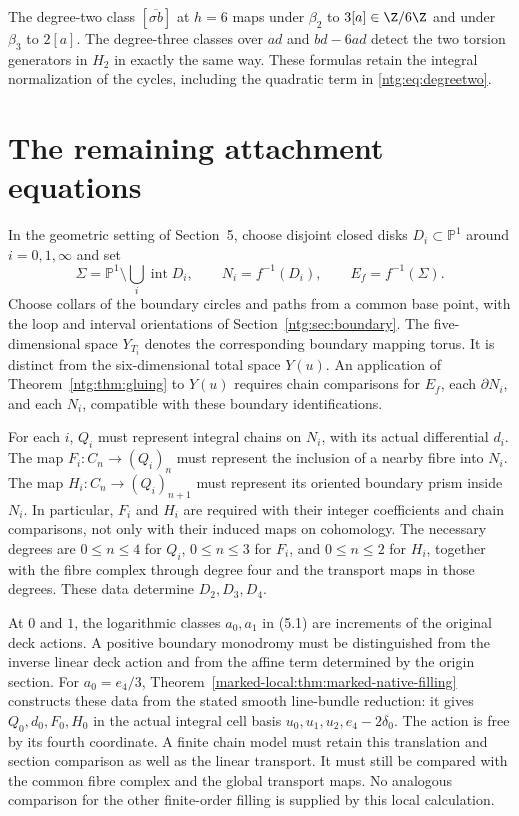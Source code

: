 The degree-two class $[\overline{\sigma b}]$ at
$h=6$ maps under $\beta_2$ to $3[a]\in\Z/6\Z$ and under
$\beta_3$ to $2[a]$. The degree-three classes over $ad$ and
$bd-6ad$ detect the two torsion generators in $H_2$ in exactly
the same way. These formulas retain the integral normalization of
the cycles, including the quadratic term in \eqref{ntg:eq:degreetwo}.

\section{The remaining attachment equations}\label{ntg:sec:remaining}

In the geometric setting of Section~5, choose disjoint closed disks
$D_i\subset\mathbb P^1$ around $i=0,1,\infty$ and set
\[
 \Sigma=\mathbb P^1\setminus\bigcup_i\operatorname{int}D_i,
 \qquad N_i=f^{-1}(D_i),\qquad E_f=f^{-1}(\Sigma).
\]
Choose collars of the boundary circles and paths from a common base
point, with the loop and interval orientations of
Section~\ref{ntg:sec:boundary}. The five-dimensional space
$Y_{T_i}$ denotes the corresponding boundary mapping torus. It is
distinct from the six-dimensional total space $Y(u)$.
An application of Theorem~\ref{ntg:thm:gluing} to $Y(u)$ requires
chain comparisons for $E_f$, each $\partial N_i$, and each $N_i$,
compatible with these boundary identifications.

For each $i$, $Q_i$ must represent integral chains on $N_i$, with its
actual differential $d_i$. The map $F_i:C_n\to(Q_i)_n$ must represent
the inclusion of a nearby fibre into $N_i$. The map
$H_i:C_n\to(Q_i)_{n+1}$ must represent its oriented boundary prism
inside $N_i$. In particular, $F_i$ and $H_i$ are required with their
integer coefficients and chain comparisons, not only with their induced
maps on cohomology. The necessary degrees are $0\le n\le4$ for
$Q_i$, $0\le n\le3$ for $F_i$, and $0\le n\le2$ for $H_i$,
together with the fibre complex through degree four and the transport
maps in those degrees. These data determine $D_2,D_3,D_4$.

At $0$ and $1$, the logarithmic classes $a_0,a_1$ in (5.1)
are increments of the original deck actions. A positive boundary
monodromy must be distinguished from the inverse linear deck action
and from the affine term determined by the origin section.
For $a_0=e_4/3$, Theorem~\ref{marked-local:thm:marked-native-filling}
constructs these data from the stated smooth line-bundle reduction:
it gives $Q_0,d_0,F_0,H_0$ in the actual integral cell basis
$u_0,u_1,u_2,e_4-2\delta_0$. The action is free by its fourth
coordinate. A finite chain model must retain this translation and
section comparison as well as the linear transport. It must still
be compared with the common fibre complex and the global transport
maps. No analogous comparison for the other finite-order filling
is supplied by this local calculation.

